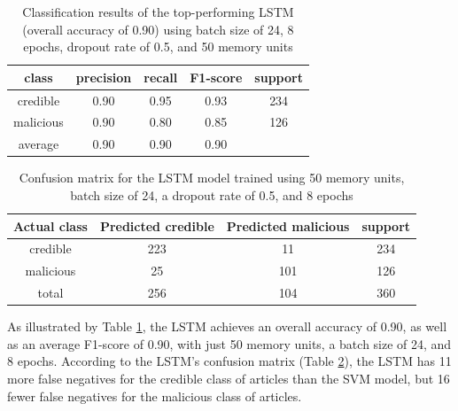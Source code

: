 \begin{table}[h]
\centering
\begin{tabular}{|c | c  c  c | c|}
\hline
class      & precision & recall & F1-score & support\\
\hline
credible   & 0.90      & 0.95   & 0.93     & 234    \\
malicious  & 0.90      & 0.80   & 0.85     & 126    \\
\hline
average    & 0.90      & 0.90   & 0.90     &   \\
\hline
\end{tabular}
\caption[LSTM's Classification Report]{Classification results of the top-performing LSTM (overall accuracy of 0.90) using batch size of 24, 8 epochs, dropout rate of 0.5, and 50 memory units}
\label{table:lstmResults}
\end{table}

\begin{table}[h]
\centering
\begin{tabular}{|c | c  c | c|}
\hline
                Actual class & 
                Predicted credible 
                &   
                Predicted malicious
                & support\\
\hline
credible   & 223                & 11        & 234\\
malicious  & 25                 & 101       & 126\\
\hline
total      & 256                & 104       & 360\\
\hline
\end{tabular}
\caption[LSTM Confusion Matrix]{Confusion matrix for the LSTM model trained using 50 memory units, batch size of 24, a dropout rate of 0.5, and 8 epochs}
\label{table:lstmConfusion}
\end{table}

As illustrated by Table \ref{table:lstmResults}, the LSTM achieves an overall accuracy of 0.90, as well as an average F1-score of 0.90, with just 50 memory units, a batch size of 24, and 8 epochs.  According to the LSTM's confusion matrix (Table \ref{table:lstmConfusion}), the LSTM has 11 more false negatives for the credible class of articles than the SVM model, but 16 fewer false negatives for the malicious class of articles.
